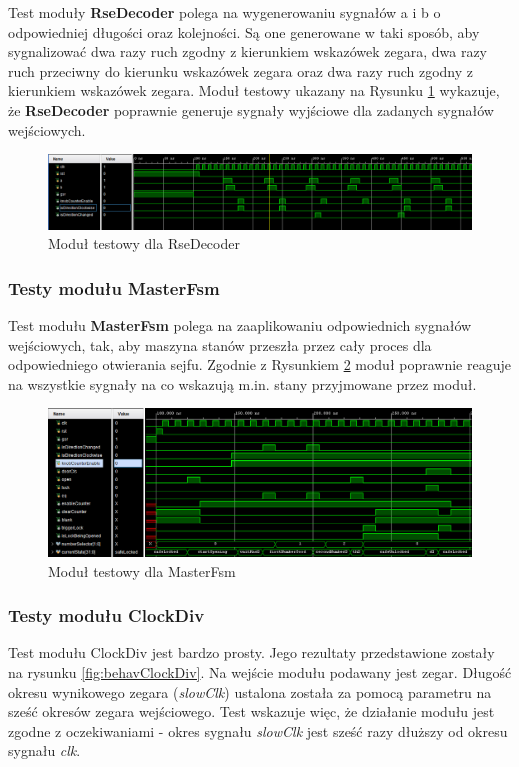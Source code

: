 \documentclass[12pt] {article}
\begin{document}
Test moduły \textbf{RseDecoder} polega na wygenerowaniu sygnałów a i b o odpowiedniej długości oraz kolejności. Są one generowane w taki sposób, aby sygnalizować dwa razy ruch zgodny z kierunkiem wskazówek zegara, dwa razy ruch przeciwny do kierunku wskazówek zegara oraz dwa razy ruch zgodny z kierunkiem wskazówek zegara. Moduł testowy ukazany na Rysunku \ref{fig:rseDecTB} wykazuje, że \textbf{RseDecoder} poprawnie generuje sygnały wyjściowe dla zadanych sygnałów wejściowych.

\begin{figure}[H]
\centering
\includegraphics[width=\textwidth]{res/behav_sims/RseDecoder_behavSim_1.png}
\caption{Moduł testowy dla RseDecoder}
\label{fig:rseDecTB}
\end{figure}

\subsubsection{Testy modułu MasterFsm}
Test modułu \textbf{MasterFsm} polega na zaaplikowaniu odpowiednich sygnałów wejściowych, tak, aby maszyna stanów przeszła przez cały proces dla odpowiedniego otwierania sejfu. Zgodnie z Rysunkiem \ref{fig:masterFsmTb} moduł poprawnie reaguje na wszystkie sygnały na co wskazują m.in. stany przyjmowane przez moduł. 


\begin{figure}[H]
\centering
\includegraphics[width=\textwidth]{res/behav_sims/master_fsm_tb.png}
\caption{Moduł testowy dla MasterFsm}
\label{fig:masterFsmTb}
\end{figure}

\subsubsection{Testy modułu ClockDiv}
Test modułu ClockDiv jest bardzo prosty. Jego rezultaty przedstawione zostały na rysunku \ref{fig:behavClockDiv}. Na wejście modułu podawany jest zegar. Długość okresu wynikowego zegara (\textit{slowClk}) ustalona została za pomocą parametru na sześć okresów zegara wejściowego. Test wskazuje więc, że działanie modułu jest zgodne z oczekiwaniami - okres sygnału \textit{slowClk} jest sześć razy dłuższy od okresu sygnału \textit{clk}.
\end{document}
